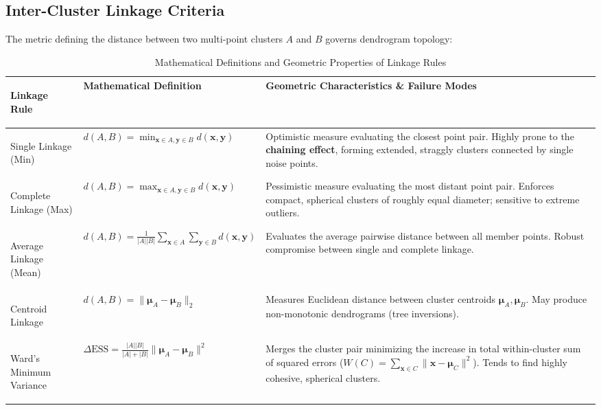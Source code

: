 \subsection{Inter-Cluster Linkage Criteria}
The metric defining the distance between two multi-point clusters $A$ and $B$ governs dendrogram topology:

\begin{table}[!htbp]
\centering
\caption{Mathematical Definitions and Geometric Properties of Linkage Rules}
\label{tab:linkage_rules}
\vspace{0.2em}
\renewcommand{\arraystretch}{1.3}
\begin{tabularx}{\textwidth}{>{\bfseries\raggedright\arraybackslash}p{3.4cm}>{\raggedright\arraybackslash}p{4.0cm}X}
\toprule
Linkage Rule & Mathematical Definition & Geometric Characteristics \& Failure Modes \\
\midrule
Single Linkage (Min) & $d(A, B) = \min_{\mathbf{x} \in A, \mathbf{y} \in B} d(\mathbf{x}, \mathbf{y})$ & Optimistic measure evaluating the closest point pair. Highly prone to the \textbf{chaining effect}, forming extended, straggly clusters connected by single noise points. \\
Complete Linkage (Max) & $d(A, B) = \max_{\mathbf{x} \in A, \mathbf{y} \in B} d(\mathbf{x}, \mathbf{y})$ & Pessimistic measure evaluating the most distant point pair. Enforces compact, spherical clusters of roughly equal diameter; sensitive to extreme outliers. \\
Average Linkage (Mean) & $d(A, B) = \frac{1}{|A||B|} \sum_{\mathbf{x} \in A} \sum_{\mathbf{y} \in B} d(\mathbf{x}, \mathbf{y})$ & Evaluates the average pairwise distance between all member points. Robust compromise between single and complete linkage. \\
Centroid Linkage & $d(A, B) = \|\boldsymbol{\mu}_A - \boldsymbol{\mu}_B\|_2$ & Measures Euclidean distance between cluster centroids $\boldsymbol{\mu}_A, \boldsymbol{\mu}_B$. May produce non-monotonic dendrograms (tree inversions). \\
Ward's Minimum Variance & $\Delta \text{ESS} = \frac{|A||B|}{|A| + |B|} \|\boldsymbol{\mu}_A - \boldsymbol{\mu}_B\|^2$ & Merges the cluster pair minimizing the increase in total within-cluster sum of squared errors ($W(C) = \sum_{\mathbf{x} \in C} \|\mathbf{x} - \boldsymbol{\mu}_C\|^2$). Tends to find highly cohesive, spherical clusters. \\
\bottomrule
\end{tabularx}
\end{table}

